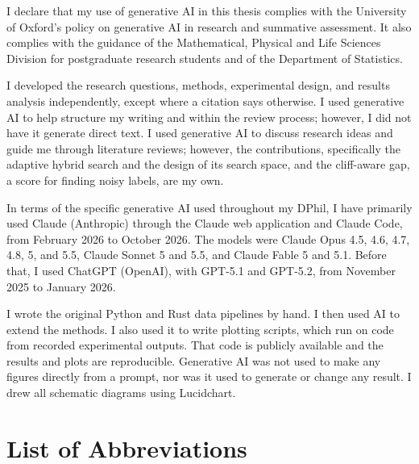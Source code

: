 \documentclass[a4paper,12pt]{report}
\begin{document}
I declare that my use of generative AI in this thesis complies with the University of Oxford's policy on generative AI in research and summative assessment. It also complies with the guidance of the Mathematical, Physical and Life Sciences Division for postgraduate research students and of the Department of Statistics. 

I developed the research questions, methods, experimental design, and results analysis independently, except where a citation says otherwise. I used generative AI to help structure my writing and within the review process; however, I did not have it generate direct text. I used generative AI to discuss research ideas and guide me through literature reviews; however, the contributions, specifically the adaptive hybrid search and the design of its search space, and the cliff-aware gap, a score for finding noisy labels, are my own. 

In terms of the specific generative AI used throughout my DPhil, I have primarily used Claude (Anthropic) through the Claude web application and Claude Code, from February 2026 to October 2026. The models were Claude Opus 4.5, 4.6, 4.7, 4.8, 5, and 5.5, Claude Sonnet 5 and 5.5, and Claude Fable 5 and 5.1. Before that, I used ChatGPT (OpenAI), with GPT-5.1 and GPT-5.2, from November 2025 to January 2026.

I wrote the original Python and Rust data pipelines by hand. I then used AI to extend the methods. I also used it to write plotting scripts, which run on code from recorded experimental outputs. That code is publicly available and the results and plots are reproducible. Generative AI was not used to make any figures directly from a prompt, nor was it used to generate or change any result. I drew all schematic diagrams using Lucidchart. 


\cleardoublepage{}
\listoffigures
\cleardoublepage{}
\listoftables

\chapter*{List of Abbreviations}
\singlespacing %
\end{document}
